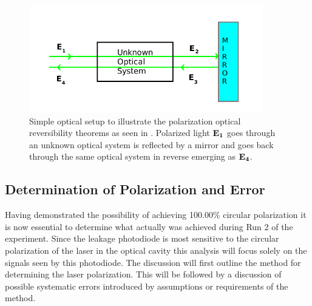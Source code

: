 \begin{figure}[ht]
\centering
\includegraphics[width=4in]{./Pictures/reversibility_nc.png}
\caption{\label{fig:reversibility}Simple optical setup to illustrate the polarization optical reversibility theorems as seen in \cite{Vansteenkiste}. Polarized light ${\bf E_1}$ goes through an unknown optical system is reflected by a mirror and goes back through the same optical system in reverse emerging as ${\bf E_4}$.}
\end{figure}
\subsection{Determination of Polarization and Error}
Having demonstrated the possibility of achieving 100.00\% circular polarization it is now essential to determine what actually was achieved during Run 2 of the \Qs experiment. Since the leakage photodiode is most sensitive to the circular polarization of the laser in the optical cavity this analysis will focus solely on the signals seen by this photodiode. The discussion will first outline the method for determining the laser polarization. This will be followed by a discussion of possible systematic errors introduced by assumptions or requirements of the method.

